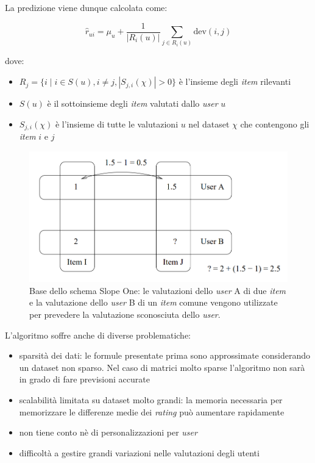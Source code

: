 La predizione viene dunque calcolata come:

\[
    \hat{r}_{ui} = \mu_u + \frac{1}{|R_i(u)|} \sum\limits_{j \in R_i(u)} \text{dev}(i, j)
\]

dove:

\begin{itemize}
    \item $R_j = \{ i \mid i \in S(u), i \neq j, |S_{j,i}(\chi)| > 0 \}$ è l'insieme degli \textit{item} rilevanti
    \item $S(u)$ è il sottoinsieme degli \textit{item} valutati dallo \textit{user} $u$
    \item $S_{j,i}(\chi)$ è l'insieme di tutte le valutazioni $u$ nel dataset $\chi$ che contengono gli \textit{item} $i$ e $j$
\end{itemize}

\begin{figure}[H]
    \centering
    \includegraphics[keepaspectratio]{figures/algorithms/slope_one.PNG}
    \caption{Base dello schema Slope One: le valutazioni dello \textit{user} A di due \textit{item} e la valutazione  dello \textit{user} B di un \textit{item} comune vengono utilizzate per prevedere la valutazione sconosciuta dello \textit{user}.}
    \label{fig:slopeone}
\end{figure}

L'algoritmo soffre anche di diverse problematiche:
\begin{itemize}
    \item sparsità dei dati: le formule presentate prima sono approssimate considerando un dataset non sparso. Nel caso di matrici molto sparse l'algoritmo non sarà in grado di fare previsioni accurate
    \item scalabilità limitata su dataset molto grandi: la memoria necessaria per memorizzare le differenze medie dei \textit{rating} può aumentare rapidamente
    \item non tiene conto nè di personalizzazioni per \textit{user} 
    \item difficoltà a gestire grandi variazioni nelle valutazioni degli utenti
\end{itemize}

